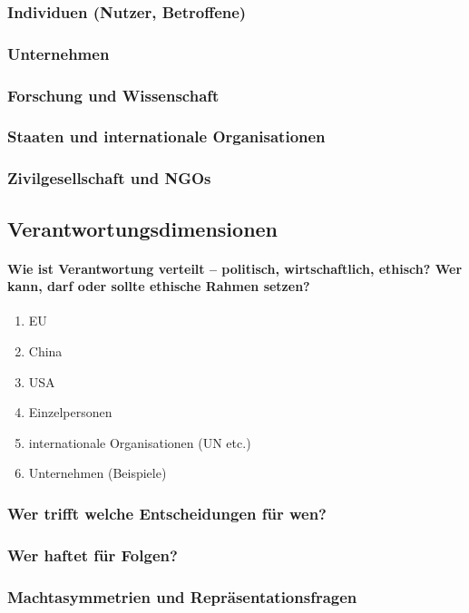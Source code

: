 \subsubsection{Individuen (Nutzer, Betroffene)}
\subsubsection{Unternehmen}
\subsubsection{Forschung und Wissenschaft}
\subsubsection{Staaten und internationale Organisationen}
\subsubsection{Zivilgesellschaft und NGOs}


\subsection{Verantwortungsdimensionen}
\paragraph{Wie ist Verantwortung verteilt – politisch, wirtschaftlich, ethisch? 
Wer kann, darf oder sollte ethische Rahmen setzen?}

\begin{enumerate}
    \item EU
    \item China
    \item USA
    \item Einzelpersonen
    \item internationale Organisationen (UN etc.)
    \item Unternehmen (Beispiele)
\end{enumerate}
 

\subsubsection{Wer trifft welche Entscheidungen für wen?}
\subsubsection{Wer haftet für Folgen?}
\subsubsection{Machtasymmetrien und Repräsentationsfragen}


